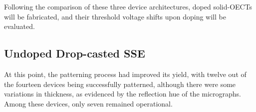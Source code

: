 Following the comparison of these three device architectures, doped solid-OECTs will be fabricated, and their threshold voltage shifts upon doping will be evaluated. %


\subsection{Undoped Drop-casted SSE}%
At this point, the patterning process had improved its yield, with twelve out of the fourteen devices being successfully patterned, although there were some variations in thickness, as evidenced by the reflection hue of the micrographs. Among these devices, only seven remained operational.


